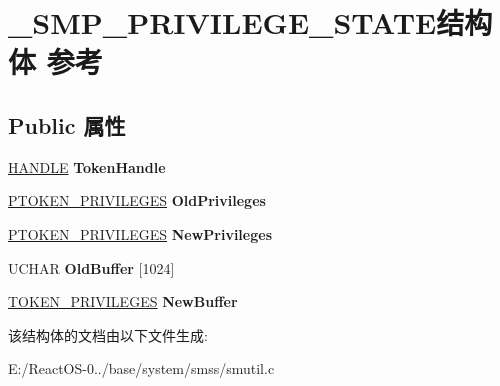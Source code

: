 \hypertarget{struct___s_m_p___p_r_i_v_i_l_e_g_e___s_t_a_t_e}{}\section{\+\_\+\+S\+M\+P\+\_\+\+P\+R\+I\+V\+I\+L\+E\+G\+E\+\_\+\+S\+T\+A\+T\+E结构体 参考}
\label{struct___s_m_p___p_r_i_v_i_l_e_g_e___s_t_a_t_e}
\subsection*{Public 属性}
\begin{DoxyCompactItemize}
\item 
\mbox{\label{struct___s_m_p___p_r_i_v_i_l_e_g_e___s_t_a_t_e_afeb5ce2a28e6058fea78a30fc1d5f985}} 
\hyperlink{interfacevoid}{H\+A\+N\+D\+LE} {\bfseries Token\+Handle}
\item 
\mbox{\label{struct___s_m_p___p_r_i_v_i_l_e_g_e___s_t_a_t_e_aeaf598753676fe837e8b3ea2cc70518c}} 
\hyperlink{struct___t_o_k_e_n___p_r_i_v_i_l_e_g_e_s}{P\+T\+O\+K\+E\+N\+\_\+\+P\+R\+I\+V\+I\+L\+E\+G\+ES} {\bfseries Old\+Privileges}
\item 
\mbox{\label{struct___s_m_p___p_r_i_v_i_l_e_g_e___s_t_a_t_e_a31b91d364d1b95ff1ed0dee3f748bed3}} 
\hyperlink{struct___t_o_k_e_n___p_r_i_v_i_l_e_g_e_s}{P\+T\+O\+K\+E\+N\+\_\+\+P\+R\+I\+V\+I\+L\+E\+G\+ES} {\bfseries New\+Privileges}
\item 
\mbox{\label{struct___s_m_p___p_r_i_v_i_l_e_g_e___s_t_a_t_e_acdcbb05435b7c24d4612394a54508d20}} 
U\+C\+H\+AR {\bfseries Old\+Buffer} \mbox{[}1024\mbox{]}
\item 
\mbox{\label{struct___s_m_p___p_r_i_v_i_l_e_g_e___s_t_a_t_e_a07b04ace859966273f310460ad92f948}} 
\hyperlink{struct___t_o_k_e_n___p_r_i_v_i_l_e_g_e_s}{T\+O\+K\+E\+N\+\_\+\+P\+R\+I\+V\+I\+L\+E\+G\+ES} {\bfseries New\+Buffer}
\end{DoxyCompactItemize}


该结构体的文档由以下文件生成\+:\begin{DoxyCompactItemize}
\item 
E\+:/\+React\+O\+S-\/0../base/system/smss/smutil.\+c\end{DoxyCompactItemize}
